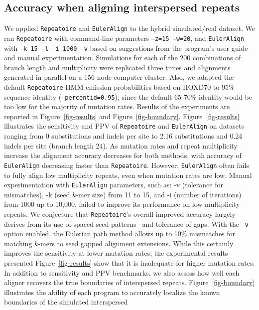 \documentclass[12pt,journal,draftcls,letterpaper,onecolumn]{IEEEtran}
\begin{document}
\subsection*{Accuracy when aligning interspersed repeats}
We applied \texttt{Repeatoire} and \texttt{EulerAlign} to the
hybrid simulated/real dataset.  We ran \texttt{Repeatoire}
with command-line parameters \texttt{--z=15 --w=20}, and
\texttt{EulerAlign} with \texttt{-k 15 -l -i 1000 -v} based on suggestions
from the program's user guide and manual experimentation.
Simulations for each of the 200 combinations of branch length and
multiplicity were replicated three times and alignments generated in
parallel on a 156-node computer cluster.  Also, we adapted the default \texttt{Repeatoire} HMM emission probabilities based on HOXD70 to 95\% sequence identity (\texttt{--percentid=0.95}), since the default 65-70\% identity would be too low for the majority of mutation rates.  Results of the experiments
are reported in Figure~\ref{fig-results} and
Figure~\ref{fig-boundary}. Figure~\ref{fig-results} illustrates the
sensitivity and PPV of
\texttt{Repeatoire} and
\texttt{EulerAlign} on datasets ranging from 0 substitutions and
indels per site to 2.16 substitutions and 0.24 indels per site (branch length 24).  As
mutation rates and repeat multiplicity increase the alignment accuracy
decreases for both methods, with accuracy of \texttt{EulerAlign}
decreasing faster than \texttt{Repeatoire}.  However, \texttt{EulerAlign}
often fails to fully align low multiplicity repeats, even when mutation rates are low.
Manual experimentation with \texttt{EulerAlign} parameters, such as: -v (tolerance for mismatches), -k (seed $k$-mer size) from 11 to 15, and -i (number of iterations) from 1000 up to 10,000, failed to improve its performance on low-multiplicity repeats.
We conjecture that \texttt{Repeatoire}'s overall improved accuracy largely derives
from its use of spaced seed patterns~\cite{ref-procrast} and tolerance
of gaps. With the \texttt{-v} option enabled, the Eulerian path method allows up to 10\% mismatches for matching $k$-mers to seed gapped alignment extensions. While this certainly improves the sensitivity at lower mutation rates, the experimental results presented Figure~\ref{fig-results} show that it is inadequate for higher mutation rates. In addition to sensitivity and PPV benchmarks, we also assess how well
each aligner recovers the true boundaries of interspersed
repeats.  Figure~\ref{fig-boundary} illustrates the ability of each
program to accurately localize the known boundaries of the simulated interspersed
\end{document}
